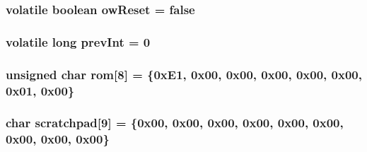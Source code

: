\hypertarget{OWRain1_8ino_af37159888cdcbe69b079b2c9dbfe3abb}{
\subsubsection[{ow\-Reset}]{\setlength{\rightskip}{0pt plus 5cm}volatile boolean ow\-Reset = {\bf false}}}\label{OWRain1_8ino_af37159888cdcbe69b079b2c9dbfe3abb}
\hypertarget{OWRain1_8ino_add5ef67690d870c53fac0f0d95438bb1}{
\subsubsection[{prev\-Int}]{\setlength{\rightskip}{0pt plus 5cm}volatile long prev\-Int = 0}}\label{OWRain1_8ino_add5ef67690d870c53fac0f0d95438bb1}
\hypertarget{OWRain1_8ino_a8beb78e2b3f2cb6e34f34861a875ca0b}{
\subsubsection[{rom}]{\setlength{\rightskip}{0pt plus 5cm}unsigned char rom\mbox{[}8\mbox{]} = \{0x\-E1, 0x00, 0x00, 0x00, 0x00, 0x00, 0x01, 0x00\}}}\label{OWRain1_8ino_a8beb78e2b3f2cb6e34f34861a875ca0b}
\hypertarget{OWRain1_8ino_a8248cc51a33adbb2adf4f80c26f0a166}{
\subsubsection[{scratchpad}]{\setlength{\rightskip}{0pt plus 5cm}char scratchpad\mbox{[}9\mbox{]} = \{0x00, 0x00, 0x00, 0x00, 0x00, 0x00, 0x00, 0x00, 0x00\}}}\label{OWRain1_8ino_a8248cc51a33adbb2adf4f80c26f0a166}
